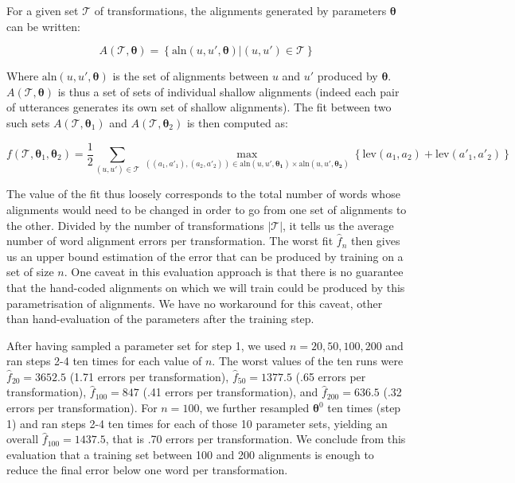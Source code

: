 For a given set \(\mathcal{T}\) of transformations, the alignments
generated by parameters \(\bm{\theta}\) can be written:

\[A\left(\mathcal{T}, \bm{\theta}\right) = \left\{ \text{aln}(u, u', \bm{\theta}) | (u, u') \in \mathcal{T} \right\}\]

Where \(\text{aln}(u, u', \bm{\theta})\) is the set of alignments
between \(u\) and \(u'\) produced by \(\bm{\theta}\).
\(A\left(\mathcal{T}, \bm{\theta}\right)\) is thus a set of sets of
individual shallow alignments (indeed each pair of utterances generates
its own set of shallow alignments). The fit between two such sets
\(A\left(\mathcal{T}, \bm{\theta}_1\right)\) and
\(A\left(\mathcal{T}, \bm{\theta}_2\right)\) is then computed as:

\[
f(\mathcal{T}, \bm{\theta}_1, \bm{\theta}_2) =
  \frac{1}{2}
  \sum_{(u, u') \in \mathcal{T}}
    \max_{((a_1, a'_1), (a_2, a'_2))
      \in \text{aln}(u, u', \bm{\theta_1}) \times \text{aln}(u, u', \bm{\theta_2})}
    \left\{
      \text{lev}(a_1, a_2) + \text{lev}(a'_1, a'_2)
    \right\}
\]

The value of the fit thus loosely corresponds to the total number of
words whose alignments would need to be changed in order to go from one
set of alignments to the other. Divided by the number of transformations
\(|\mathcal{T}|\), it tells us the average number of word alignment
errors per transformation. The worst fit \(\hat{f}_n\) then gives us an
upper bound estimation of the error that can be produced by training on
a set of size \(n\). One caveat in this evaluation approach is that
there is no guarantee that the hand-coded alignments on which we will
train could be produced by this parametrisation of alignments. We have
no workaround for this caveat, other than hand-evaluation of the
parameters after the training step.

After having sampled a parameter set for step 1, we used
\(n = 20, 50, 100, 200\) and ran steps 2-4 ten times for each value of
\(n\). The worst values of the ten runs were \(\hat{f}_{20} = 3652.5\)
(1.71 errors per transformation), \(\hat{f}_{50} = 1377.5\) (.65 errors
per transformation), \(\hat{f}_{100} = 847\) (.41 errors per
transformation), and \(\hat{f}_{200} = 636.5\) (.32 errors per
transformation). For \(n = 100\), we further resampled \(\bm{\theta}^0\)
ten times (step 1) and ran steps 2-4 ten times for each of those 10
parameter sets, yielding an overall \(\hat{f}_{100} = 1437.5\), that is
.70 errors per transformation. We conclude from this evaluation that a
training set between 100 and 200 alignments is enough to reduce the
final error below one word per transformation.

